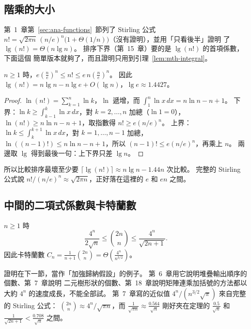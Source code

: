 \subsection{階乘的大小}

第~1~章第~\ref{sec:ana-functions}~節列了 Stirling 公式
$n! = \sqrt{2\pi n}\,(n/e)^n\bigl(1 + \Theta(1/n)\bigr)$（沒有證明），並用「只看後半」證明
了 $\lg(n!) = \Theta(n \lg n)$。 排序下界（第~15~章）要的是 $\lg(n!)$ 的首項係數，下面這個
簡單版本就夠了，而且證明只用到引理~\ref{lem:mth-integral}。

\begin{theorem}
\label{thm:mth-stirling}
$n \ge 1$ 時，$e \left(\frac{n}{e}\right)^n \le n! \le e\, n \left(\frac{n}{e}\right)^n$。
因此 $\lg(n!) = n \lg n - n \lg e + O(\lg n)$，$\lg e \approx 1.4427$。
\end{theorem}

\begin{proof}
$\ln(n!) = \sum_{k=1}^{n} \ln k$，$\ln$ 遞增，而 $\int_1^n \ln x\,dx = n \ln n - n + 1$。
下界：$\ln k \ge \int_{k-1}^{k} \ln x\,dx$，對 $k = 2, \ldots, n$ 加總（$\ln 1 = 0$），
$\ln(n!) \ge n \ln n - n + 1$，取指數得 $n! \ge e(n/e)^n$。 上界：$\ln k \le \int_k^{k+1}
\ln x\,dx$，對 $k = 1, \ldots, n - 1$ 加總，$\ln((n-1)!) \le n \ln n - n + 1$，所以
$(n-1)! \le e(n/e)^n$，再乘上 $n$。 兩邊取 $\lg$ 得到最後一句：上下界只差 $\lg n$。
\end{proof}

所以比較排序最壞至少要 $\lceil \lg(n!) \rceil \approx n \lg n - 1.44n$ 次比較。 完整的
Stirling 公式說 $n!/(n/e)^n \approx \sqrt{2\pi n}$，正好落在這裡的 $e$ 和 $en$ 之間。

\subsection{中間的二項式係數與卡特蘭數}

\begin{theorem}
\label{thm:mth-central}
$n \ge 1$ 時
\[
\frac{4^n}{2\sqrt{n}} \le \binom{2n}{n} \le \frac{4^n}{\sqrt{2n+1}} .
\]
因此卡特蘭數 $C_n = \frac{1}{n+1}\binom{2n}{n} = \Theta\!\left(\frac{4^n}{n^{3/2}}\right)$。
\end{theorem}

證明在下一節，當作「加強歸納假設」的例子。 第~6~章用它說明堆疊輸出順序的個數、第~7~章說明
二元樹形狀的個數、第~18~章說明矩陣連乘加括號的方法都以大約 $4^n$ 的速度成長，不能全部試。
第~7~章寫的近似值 $4^n / (n^{3/2}\sqrt{\pi})$ 來自完整的 Stirling 公式：
$\binom{2n}{n} \approx 4^n / \sqrt{\pi n}$，而 $\frac{1}{\sqrt{\pi n}} \approx
\frac{0.564}{\sqrt n}$ 剛好夾在定理的 $\frac{0.5}{\sqrt n}$ 和 $\frac{1}{\sqrt{2n+1}} <
\frac{0.708}{\sqrt n}$ 之間。

